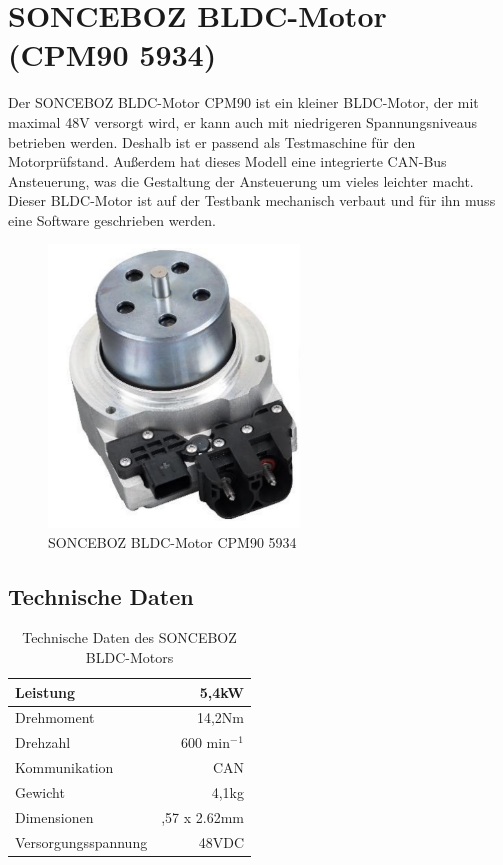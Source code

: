 \section{SONCEBOZ BLDC-Motor (CPM90 5934)}
Der SONCEBOZ BLDC-Motor CPM90 ist ein kleiner BLDC-Motor, der mit maximal 48V versorgt wird, er kann auch mit niedrigeren Spannungsniveaus betrieben werden. Deshalb ist er passend als Testmaschine für den Motorprüfstand. Au{\ss}erdem hat dieses Modell eine integrierte CAN-Bus Ansteuerung, was die Gestaltung der Ansteuerung um vieles leichter macht. \cite{SONCEBOZ}
Dieser BLDC-Motor ist auf der Testbank mechanisch verbaut und für ihn muss eine Software geschrieben werden. 


\begin{figure}[h]
    \begin{center}
        \includegraphics[width=6.68cm, height= 7.5cm]{images/Abbildung 3.png}
        \caption{SONCEBOZ BLDC-Motor CPM90 5934 \cite{SONCEBOZ}}
        \label{SONCEBOZ BLDC}
        \end{center}
\end{figure}
\clearpage
\subsection{Technische Daten}

\begin{table}[ht]
    \centering
    \begin{tabular}{|l | r|} 
        \hline
        Leistung & 5,4kW\\
        \hline
        Drehmoment & 14,2Nm\\
        \hline
        Drehzahl & 600 min$^-$$^1$ \\
        \hline
        Kommunikation & CAN\\
        \hline
        Gewicht & 4,1kg\\
        \hline
        Dimensionen & \emptyset 88,57 x 2.62mm\\
        \hline
        Versorgungsspannung & 48VDC\\
        \hline
    \end{tabular}

    
    \caption{Technische Daten des SONCEBOZ BLDC-Motors \cite{SONCEBOZ}}
    \label{table::tDaten}
\end{table}

